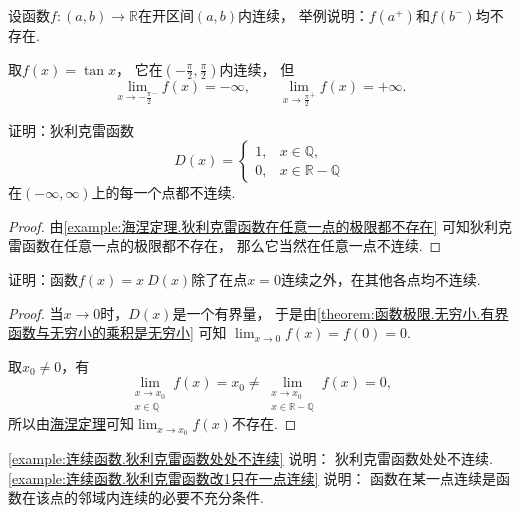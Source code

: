 \begin{example}
设函数\(f\colon(a,b)\to\mathbb{R}\)在开区间\((a,b)\)内连续，
举例说明：\(f(a^+)\)和\(f(b^-)\)均不存在.
\begin{solution}
取\(f(x) = \tan x\)，
它在\(\left( -\frac\pi2,\frac\pi2 \right)\)内连续，
但\[
	\lim_{x\to-\frac\pi2^-} f(x) = -\infty,
	\qquad
	\lim_{x\to\frac\pi2^+} f(x) = +\infty.
\]
\end{solution}
\end{example}

\begin{example}\label{example:连续函数.狄利克雷函数处处不连续}
证明：狄利克雷函数\[
	D(x) = \left\{ \begin{array}{ll}
		1, & x \in \mathbb{Q}, \\
		0, & x \in \mathbb{R}-\mathbb{Q}
	\end{array} \right.
\]在\((-\infty,\infty)\)上的每一个点都不连续.
\begin{proof}
由\cref{example:海涅定理.狄利克雷函数在任意一点的极限都不存在}
可知狄利克雷函数在任意一点的极限都不存在，
那么它当然在任意一点不连续.
\end{proof}
\end{example}
\begin{example}\label{example:连续函数.狄利克雷函数改1只在一点连续}
证明：函数\(f(x) = x~D(x)\)除了在点\(x=0\)连续之外，在其他各点均不连续.
\begin{proof}
当\(x\to0\)时，\(D(x)\)是一个有界量，
于是由\cref{theorem:函数极限.无穷小.有界函数与无穷小的乘积是无穷小} 可知
\(\lim_{x\to0} f(x) = f(0) = 0\).

取\(x_0\neq0\)，有\[
	\lim_{\substack{x \to x_0 \\ x \in \mathbb{Q}}} f(x)
	= x_0
	\neq
	\lim_{\substack{x \to x_0 \\ x \in \mathbb{R}-\mathbb{Q}}} f(x)
	= 0,
\]
所以由\hyperref[theorem:极限.海涅定理]{海涅定理}可知\(\lim_{x \to x_0} f(x)\)不存在.
\end{proof}
\end{example}
\begin{remark}
\cref{example:连续函数.狄利克雷函数处处不连续} 说明：
狄利克雷函数处处不连续.
\cref{example:连续函数.狄利克雷函数改1只在一点连续} 说明：
函数在某一点连续是函数在该点的邻域内连续的必要不充分条件.
\end{remark}

